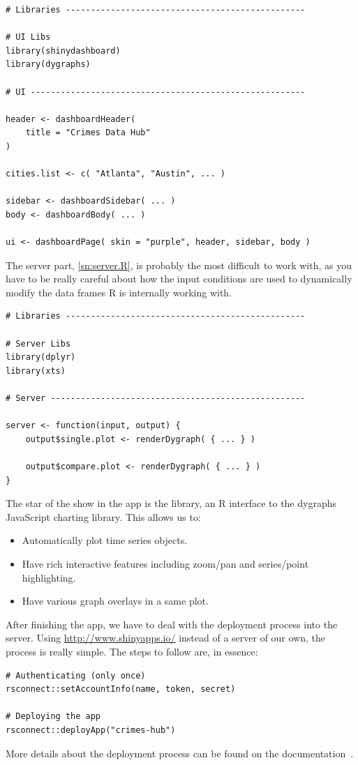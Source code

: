 \begin{lstlisting}[label=sn:ui.R, caption=Simplified structure of \inline{ui.R}]
# Libraries ------------------------------------------------

# UI Libs
library(shinydashboard)
library(dygraphs)

# UI -------------------------------------------------------

header <- dashboardHeader(
	title = "Crimes Data Hub"
)

cities.list <- c( "Atlanta", "Austin", ... )

sidebar <- dashboardSidebar( ... )
body <- dashboardBody( ... )

ui <- dashboardPage( skin = "purple", header, sidebar, body )
\end{lstlisting}

The server part, \cref{sn:server.R}, is probably the most difficult to work with, as you have to be really careful about how the input conditions are used to dynamically modify the data frames R is internally working with.

\begin{lstlisting}[label=sn:server.R, caption=Simplified structure of \inline{server.R}]
# Libraries ------------------------------------------------

# Server Libs
library(dplyr)
library(xts)

# Server ---------------------------------------------------

server <- function(input, output) {
	output$single.plot <- renderDygraph( { ... } )

	output$compare.plot <- renderDygraph( { ... } )
}
\end{lstlisting}

The star of the show in the app is the  library, an R interface to the dygraphs JavaScript charting library. This allows us to:
\begin{itemize}
    \item Automatically plot  time series objects.
    \item Have rich interactive features including zoom/pan and series/point highlighting.
    \item Have various graph overlays in a same plot.
\end{itemize}

\bigskip

After finishing the app, we have to deal with the deployment process into the server. Using \url{http://www.shinyapps.io/} instead of a server of our own, the process is really simple. The steps to follow are, in essence:
\begin{lstlisting}
# Authenticating (only once)
rsconnect::setAccountInfo(name, token, secret)

# Deploying the app
rsconnect::deployApp("crimes-hub")
\end{lstlisting}

More details about the deployment process can be found on the documentation~\cite{o:shinyapps-docs}.
